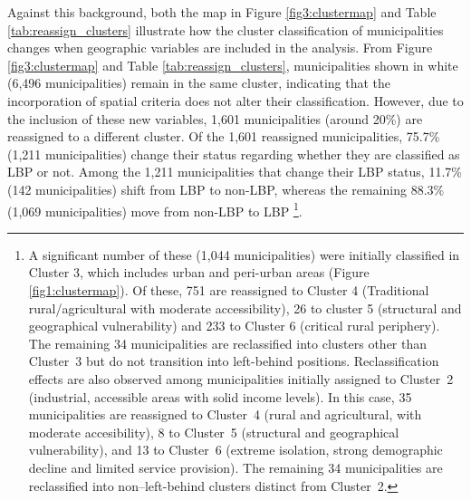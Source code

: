 \documentclass[a4paper,11pt,oneside]{article}
\begin{document}
Against this background, both the map in Figure \ref{fig3:clustermap} and Table \ref{tab:reassign_clusters} illustrate how the cluster classification of municipalities changes when geographic variables are included in the analysis. From Figure \ref{fig3:clustermap} and Table \ref{tab:reassign_clusters}, municipalities shown in white (6,496 municipalities) remain in the same cluster, indicating that the incorporation of spatial criteria does not alter their classification. However, due to the inclusion of these new variables,  1,601 municipalities (around 20\%) are reassigned to a different cluster. Of the 1,601 reassigned municipalities, 75.7\% (1,211 municipalities) change their status regarding whether they are classified as LBP or not. Among the 1,211 municipalities that change their LBP status, 11.7\% (142 municipalities) shift from LBP to non-LBP, whereas the remaining 88.3\% (1,069 municipalities) move from non-LBP to LBP \footnote{A significant number of these (1,044 municipalities) were initially classified in Cluster 3, which includes urban and peri-urban areas (Figure \ref{fig1:clustermap}).
Of these, 751 are reassigned to Cluster 4 (Traditional rural/agricultural with moderate accessibility), 26 to cluster 5 (structural and geographical vulnerability) and 233 to Cluster 6 (critical rural periphery). The remaining 34 municipalities are reclassified into clusters other than Cluster~3 but do not transition into left-behind positions. Reclassification effects are also observed among municipalities initially assigned to Cluster~2 (industrial, accessible areas with solid income levels). In this case, 35 municipalities are reassigned to Cluster~4 (rural and agricultural, with moderate accesibility), 8 to Cluster~5 (structural and geographical vulnerability), and 13 to Cluster~6 (extreme isolation, strong demographic decline and limited service provision). The remaining 34 municipalities are reclassified into non–left-behind clusters distinct from Cluster~2.
}.
\end{document}
